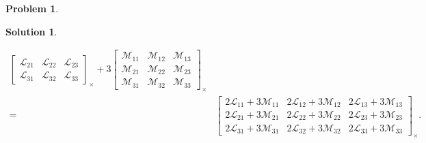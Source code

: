 \documentclass{article}
\theoremstyle{definition}
\newtheorem*{prob*}{Problem}
\newtheorem*{sln*}{Solution}
\newcommand{\lag}{\mathcal{L}}
\newcommand{\M}{\mathcal{M}}
\begin{document}
\begin{prob*}
\begin{sln*}
\begin{enumerate}
\begin{enumerate}
\begin{align*}
\begin{bmatrix}
			\lag_{21} & \lag_{22} & \lag_{23}\\
			\lag_{31} & \lag_{32} & \lag_{33}
			\end{bmatrix}_\times 
			+ 
			3\begin{bmatrix}
			\M_{11} & \M_{12} & \M_{13}\\
			\M_{21} & \M_{22} & \M_{23}\\
			\M_{31} & \M_{32} & \M_{33}
			\end{bmatrix}_\times\\
			=
			& \begin{bmatrix}
			2\lag_{11} + 3\M_{11} & 2\lag_{12} + 3\M_{12} & 2\lag_{13} + 3\M_{13}\\
			2\lag_{21} + 3\M_{21} & 2\lag_{22} + 3\M_{22} & 2\lag_{23} + 3\M_{23}\\
			2\lag_{31} + 3\M_{31} & 2\lag_{32} + 3\M_{32} & 2\lag_{33} + 3\M_{33}
			\end{bmatrix}_\times.
			\end{align*}
			
			
			
			
			
			
			
			
			
			
			
			
			
			
			
			
			
			\newpage
			

\end{enumerate}
\end{enumerate}
\end{sln*}
\end{prob*}
\end{document}
